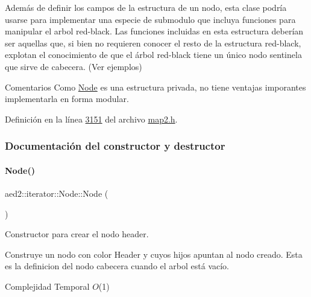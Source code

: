 Además de definir los campos de la estructura de un nodo, esta clase podría usarse para implementar una especie de submodulo que incluya funciones para manipular el arbol red-\/black. Las funciones incluidas en esta estructura deberían ser aquellas que, si bien no requieren conocer el resto de la estructura red-\/black, explotan el conocimiento de que el árbol red-\/black tiene un único nodo sentinela que sirve de cabecera. (Ver ejemplos)

\begin{DoxyRemark}{Comentarios}
Como \hyperlink{structaed2_1_1iterator_1_1Node}{Node} es una estructura privada, no tiene ventajas imporantes implementarla en forma modular. 
\end{DoxyRemark}


Definición en la línea \hyperlink{map2_8h_source_l03151}{3151} del archivo \hyperlink{map2_8h_source}{map2.\+h}.



\subsubsection{Documentación del constructor y destructor}
\mbox{\label{structaed2_1_1iterator_1_1Node_a143f108a38e8990d7d60ad48dd521654_a143f108a38e8990d7d60ad48dd521654}} 
\paragraph{\texorpdfstring{Node()}{Node()}\hspace{0.1cm}{\footnotesize\ttfamily [1/2]}}
{\footnotesize\ttfamily aed2\+::iterator\+::\+Node\+::\+Node (\begin{DoxyParamCaption}{ }\end{DoxyParamCaption})\hspace{0.3cm}{\ttfamily [inline]}}



Constructor para crear el nodo header. 

Construye un nodo con color Header y cuyos hijos apuntan al nodo creado. Esta es la definicion del nodo cabecera cuando el arbol está vacío.


\begin{DoxyDescription}
\item[Complejidad Temporal]$O$(1)
\end{DoxyDescription}

